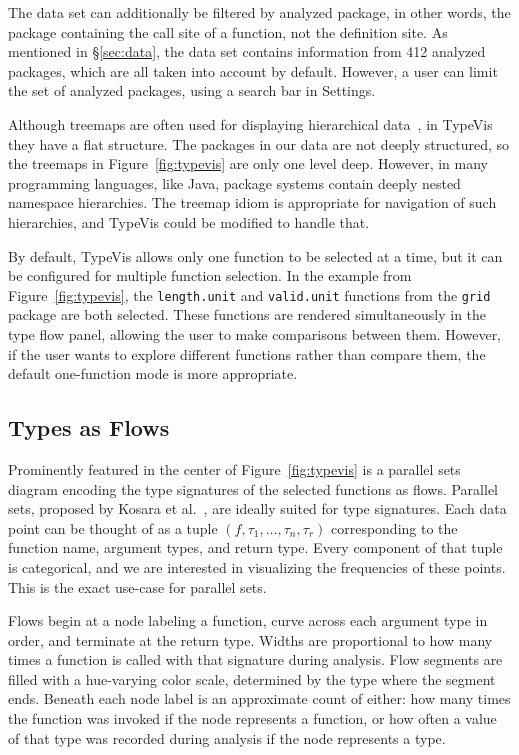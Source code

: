 \documentclass[review]{vgtc}                 %
\newcommand{\typevis}{{\sc TypeVis}\xspace}
\newcommand{\figref}[1]{Figure~\ref{#1}\xspace}
\newcommand{\pkgNumAnalyzed}{412\xspace}
\newcommand{\settingsTab}{{\sc Settings}\xspace}
\begin{document}
The data set can additionally be filtered by analyzed package,
in other words, the package containing the call site of a function, not the definition site.
As mentioned in \S\ref{sec:data}, the data set contains information
from \pkgNumAnalyzed analyzed packages, which are all taken into account
by default. However, a user can limit the set of analyzed packages,
using a search bar in \settingsTab.

Although treemaps are often used for displaying
hierarchical data~\cite{shneiderman:1992},
in \typevis they have a flat structure.
The packages in our data are not deeply structured,
so the treemaps in \figref{fig:typevis} are only one level deep.
However, in many programming languages, like Java,
package systems contain deeply nested namespace hierarchies.
The treemap idiom is appropriate for navigation of such
hierarchies, and
\typevis could be modified to handle that.

By default, \typevis allows only one function to be selected at a time,
but it can be configured for multiple function selection.
In the example from \figref{fig:typevis},
the {\tt length.unit} and {\tt valid.unit} functions
from the {\tt grid} package are both selected.
These functions are rendered simultaneously in the type flow
panel, allowing the user to make comparisons between them.
However, if the user wants to explore different functions rather than
compare them, the default one-function mode is more appropriate.

\subsection{Types as Flows}

Prominently featured in the center of \figref{fig:typevis}
is a parallel sets diagram encoding the type signatures of the selected
functions as flows.
Parallel sets,
proposed by Kosara et al.~\cite{kosara:2006},
are ideally suited for type signatures.
Each data point can be thought of as
a tuple $(f, \tau_1, \ldots, \tau_n, \tau_r)$
corresponding to the function name,
argument types,
and return type.
Every component of that tuple is categorical,
and we are interested in visualizing the frequencies of these points.
This is the exact use-case for parallel sets.

Flows begin at a node labeling a function,
curve across each argument type in order,
and terminate at the return type.
Widths are proportional to how many times a function
is called with that signature during analysis.
Flow segments are filled with a hue-varying color scale,
determined by the type where the segment ends.
Beneath each node label is an approximate count of either:
how many times the function was invoked if the node represents a function,
or how often a value of that type was recorded during analysis if the node represents a type.
\end{document}
